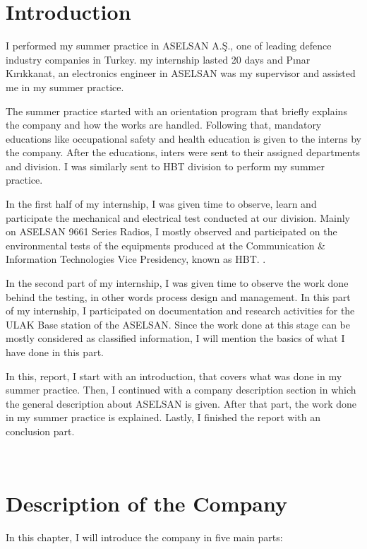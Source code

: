 \blankpage



\tableofcontents
\newpage



\section{Introduction}
\-\indent 
	I performed my summer practice in ASELSAN A.Ş., one of leading defence industry companies in Turkey. my internship lasted 20 days and Pınar Kırıkkanat, an electronics engineer in ASELSAN was my supervisor and assisted me in my summer practice.

	The summer practice started with an orientation program that briefly explains the company and how the works are handled. Following that, mandatory educations like occupational safety and health education is given to the interns by the company. After the educations, inters were sent to their assigned departments and division. I was similarly sent to HBT division to perform my summer practice.
	
	In the first half of my internship, I was given time to observe, learn and participate the mechanical and electrical test conducted at our division. Mainly on ASELSAN 9661 Series Radios, I mostly observed and participated on the environmental tests of the equipments produced at the Communication \& Information Technologies Vice Presidency, known as HBT. .
	
	In the second part of my internship, I was given time to observe the work done behind the testing, in other words process design and management. In this part of my internship, I participated on documentation and research activities for the ULAK Base station of the ASELSAN. Since the work done at this stage can be mostly considered as classified information, I will mention the basics of what I have done in this part.
	
	In this, report, I start with an introduction, that covers what was done in my summer practice. Then, I continued with a company description section in which the general description about ASELSAN is given. After that part, the work done in my summer practice is explained. Lastly, I finished the report with an conclusion part. 
	

\- \\[3cm]
 

\section{Description of the Company}
\- \indent
	In this chapter, I will introduce the company in five main parts:




